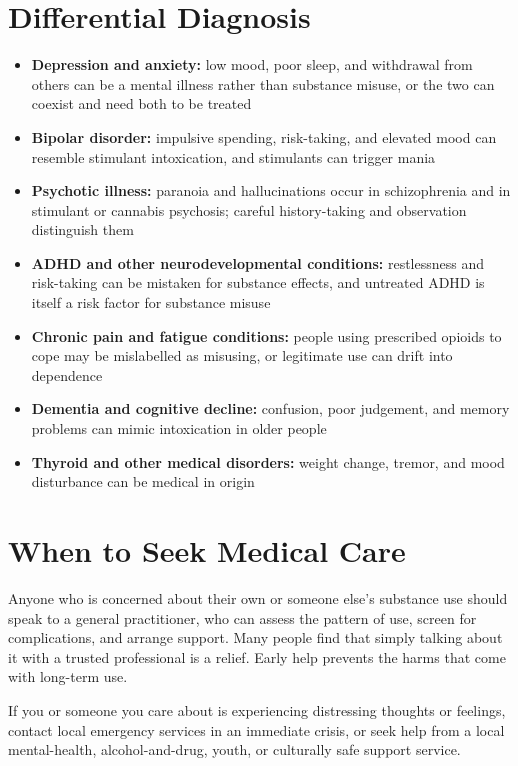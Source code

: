 \section*{Differential Diagnosis}
\begin{itemize}
    \item \textbf{Depression and anxiety:} low mood, poor sleep, and withdrawal from others can be a mental illness rather than substance misuse, or the two can coexist and need both to be treated
    \item \textbf{Bipolar disorder:} impulsive spending, risk-taking, and elevated mood can resemble stimulant intoxication, and stimulants can trigger mania
    \item \textbf{Psychotic illness:} paranoia and hallucinations occur in schizophrenia and in stimulant or cannabis psychosis; careful history-taking and observation distinguish them
    \item \textbf{ADHD and other neurodevelopmental conditions:} restlessness and risk-taking can be mistaken for substance effects, and untreated ADHD is itself a risk factor for substance misuse
    \item \textbf{Chronic pain and fatigue conditions:} people using prescribed opioids to cope may be mislabelled as misusing, or legitimate use can drift into dependence
    \item \textbf{Dementia and cognitive decline:} confusion, poor judgement, and memory problems can mimic intoxication in older people
    \item \textbf{Thyroid and other medical disorders:} weight change, tremor, and mood disturbance can be medical in origin
\end{itemize}

\section*{When to Seek Medical Care}
Anyone who is concerned about their own or someone else's substance use should speak to a general practitioner, who can assess the pattern of use, screen for complications, and arrange support. Many people find that simply talking about it with a trusted professional is a relief. Early help prevents the harms that come with long-term use.

If you or someone you care about is experiencing distressing thoughts or feelings, contact local emergency services in an immediate crisis, or seek help from a local mental-health, alcohol-and-drug, youth, or culturally safe support service.

